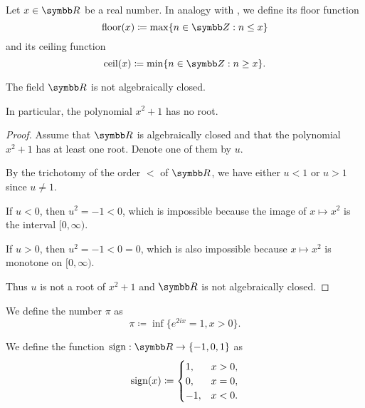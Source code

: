 \begin{definition}\label{def:floor_ceiling_functions}
  Let \( x \in \BR \) be a real number. In analogy with , we define its floor function
  \begin{equation*}
    \Floor(x) \coloneqq \max \{ n \in \BZ : n \leq x \}
  \end{equation*}
  and its ceiling function
  \begin{equation*}
    \Ceil(x) \coloneqq \min \{ n \in \BZ : n \geq x \}.
  \end{equation*}
\end{definition}

\begin{proposition}\label{thm:reals_not_algebraically_closed}
  The field \( \BR \) is not algebraically closed.

  In particular, the polynomial \( x^2 + 1 \) has no root.
\end{proposition}
\begin{proof}
  Assume that \( \BR \) is algebraically closed and that the polynomial \( x^2 + 1 \) has at least one root. Denote one of them by \( u \).

  By the trichotomy of the order \( < \) of \( \BR \), we have either \( u < 1 \) or \( u > 1 \) since \( u \neq 1 \).

  If \( u < 0 \), then \( u^2 = -1 < 0 \), which is impossible because the image of \( x \mapsto x^2 \) is the interval \( [0, \infty) \).

  If \( u > 0 \), then \( u^2 = -1 < 0 = 0 \), which is also impossible because \( x \mapsto x^2 \) is monotone on \( [0, \infty) \).

  Thus \( u \) is not a root of \( x^2 + 1 \) and \( \BR \) is not algebraically closed.
\end{proof}

\begin{definition}\label{def:pi}\cite[515]{Knapp2016BAlg}
  We define the number \( \pi \) as
  \begin{equation*}
    \pi \coloneqq \inf\{ e^{2ix} = 1, x > 0 \}.
  \end{equation*}
\end{definition}

\begin{definition}\label{def:signum}
  We define the  function \( \Sign: \BR \to \{ -1, 0, 1 \} \) as
  \begin{equation*}
    \operatorname{sign}(x) \coloneqq \begin{cases}
      1,  &x > 0, \\
      0,  &x = 0, \\
      -1, &x < 0.
    \end{cases}
  \end{equation*}
\end{definition}
